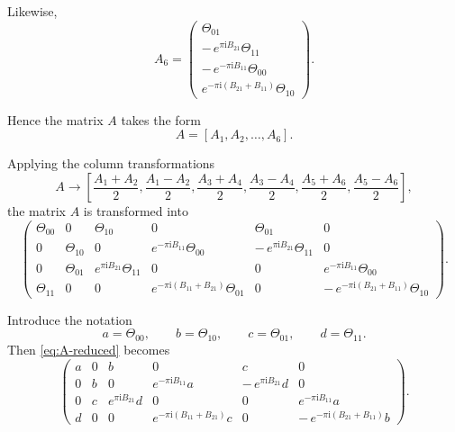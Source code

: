 \documentclass{amsart}
\newcounter{hw}
\numberwithin{equation}{hw}
\begin{document}
Likewise,
\begin{equation}
A_6
=
\begin{pmatrix}
\Theta_{01}\\[4pt]
-\,e^{\pi\mathrm{i}B_{21}}
\Theta_{11}\\[4pt]
-\,e^{-\pi\mathrm{i}B_{11}}
\Theta_{00}\\[4pt]
e^{-\pi\mathrm{i}(B_{21}+B_{11})}
\Theta_{10}
\end{pmatrix}.
\label{eq:A6}
\end{equation}

Hence the matrix \(A\) takes the form
\begin{equation}
A
=
[A_1,A_2,\ldots,A_6].
\label{eq:A-matrix-hw2}
\end{equation}

Applying the column transformations
\[
A
\longrightarrow
\left[
\frac{A_1+A_2}{2},
\frac{A_1-A_2}{2},
\frac{A_3+A_4}{2},
\frac{A_3-A_4}{2},
\frac{A_5+A_6}{2},
\frac{A_5-A_6}{2}
\right],
\]
the matrix \(A\) is transformed into
\begin{equation}
\begin{pmatrix}
\Theta_{00}
&
0
&
\Theta_{10}
&
0
&
\Theta_{01}
&
0
\\[6pt]
0
&
\Theta_{10}
&
0
&
e^{-\pi\mathrm{i}B_{11}}
\Theta_{00}
&
-\,e^{\pi\mathrm{i}B_{21}}
\Theta_{11}
&
0
\\[6pt]
0
&
\Theta_{01}
&
e^{\pi\mathrm{i}B_{21}}
\Theta_{11}
&
0
&
0
&
e^{-\pi\mathrm{i}B_{11}}
\Theta_{00}
\\[6pt]
\Theta_{11}
&
0
&
0
&
e^{-\pi\mathrm{i}(B_{11}+B_{21})}
\Theta_{01}
&
0
&
-\,e^{-\pi\mathrm{i}(B_{21}+B_{11})}
\Theta_{10}
\end{pmatrix}.
\label{eq:A-reduced}
\end{equation}

Introduce the notation
\begin{equation}
a=\Theta_{00},
\qquad
b=\Theta_{10},
\qquad
c=\Theta_{01},
\qquad
d=\Theta_{11}.
\label{eq:abcd-definition}
\end{equation}
Then \eqref{eq:A-reduced} becomes
\begin{equation}
\begin{pmatrix}
a & 0 & b & 0 & c & 0
\\[6pt]
0
&
b
&
0
&
e^{-\pi\mathrm{i}B_{11}}a
&
-\,e^{\pi\mathrm{i}B_{21}}d
&
0
\\[6pt]
0
&
c
&
e^{\pi\mathrm{i}B_{21}}d
&
0
&
0
&
e^{-\pi\mathrm{i}B_{11}}a
\\[6pt]
d
&
0
&
0
&
e^{-\pi\mathrm{i}(B_{11}+B_{21})}c
&
0
&
-\,e^{-\pi\mathrm{i}(B_{21}+B_{11})}b
\end{pmatrix}.
\label{eq:A-reduced-abcd}
\end{equation}
\end{document}
